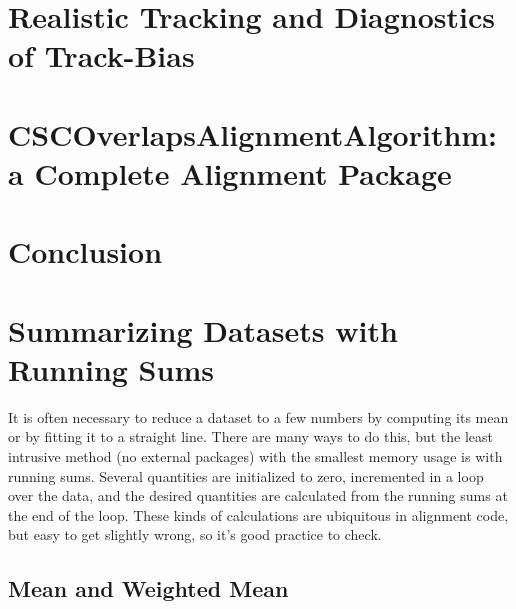 \documentclass[12pt]{article}
\begin{document}
\section{Realistic Tracking and Diagnostics of Track-Bias}
\label{sec:realistic_tracking_and_diagnostics_of_track_bias}


\section{CSCOverlapsAlignmentAlgorithm: a Complete Alignment Package}
\label{sec:cscoverlapsalignmentalgorithm_a_complete_alignment_package}

\section{Conclusion}
\label{sec:conclusion}


\appendixpage
\appendix
\section{Summarizing Datasets with Running Sums}
\label{sec:summarizing_datasets_with_running_sums}

It is often necessary to reduce a dataset to a few numbers by
computing its mean or by fitting it to a straight line.  There are
many ways to do this, but the least intrusive method (no external
packages) with the smallest memory usage is with running sums.
Several quantities are initialized to zero, incremented in a loop over
the data, and the desired quantities are calculated from the running
sums at the end of the loop.  These kinds of calculations are
ubiquitous in alignment code, but easy to get slightly wrong, so it's
good practice to check.

\subsection{Mean and Weighted Mean}
\end{document}
